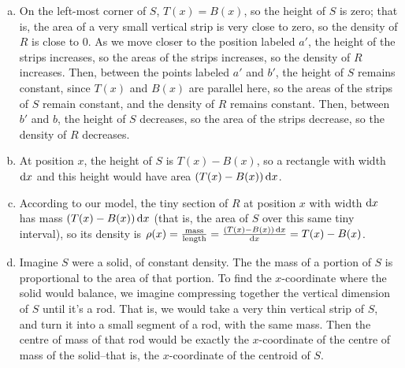 \begin{solution}
\begin{enumerate}[(a)]
\item
On the left-most corner of $S$, $T(x)=B(x)$, so the height of $S$ is zero; that is, the area of a very small vertical strip is very close to zero, so the density of $R$ is close to 0. As we move closer to the position labeled $a'$, the height of the strips increases, so the areas of the strips increases, so the density of $R$ increases. Then, between the points labeled $a'$ and $b'$, the height of $S$ remains constant, since $T(x)$ and $B(x)$ are parallel here, so the areas of the strips of $S$ remain constant, and the density of $R$ remains constant. Then, between $b'$ and $b$, the height of $S$ decreases, so the area of the strips decrease, so the density of $R$ decreases.
\begin{center}
\end{center}
\item At position $x$, the height of $S$ is $T(x)-B(x)$, so a rectangle with width $\mathrm{d}x$ and this height would have area $(T(x)-B(x))\,\mathrm{d}x$.
\item According to our model, the tiny section of $R$ at position $x$ with width $\mathrm{d}x$ has mass $(T(x)-B(x))\,\mathrm{d}x$ (that is, the area of $S$ over this same tiny interval), so its density is $\rho(x) = \frac{\text{mass}}{\text{length}} = \frac{(T(x)-B(x))\,\mathrm{d}x}{\mathrm{d}x} = T(x)-B(x)$.
\item
Imagine $S$ were a solid, of constant density. The the mass of a portion of $S$ is proportional to the area of that portion. To find the $x$-coordinate where the solid would balance, we imagine compressing together the vertical dimension of $S$ until it's a rod. That is, we would take a very thin vertical strip of $S$, and turn it into a small segment of a rod, with the same mass. Then the centre of mass of that rod would be exactly the $x$-coordinate of the centre of mass of the solid--that is, the $x$-coordinate of the centroid of $S$.


\end{enumerate}
\end{solution}

